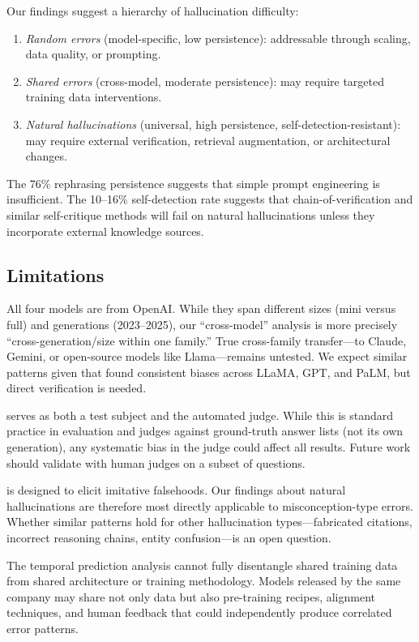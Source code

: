 Our findings suggest a hierarchy of hallucination difficulty:
\begin{enumerate}[leftmargin=*,itemsep=0pt,topsep=0pt]
    \item \emph{Random errors} (model-specific, low persistence): addressable through scaling, data quality, or prompting.
    \item \emph{Shared errors} (cross-model, moderate persistence): may require targeted training data interventions.
    \item \emph{Natural hallucinations} (universal, high persistence, self-detection-resistant): may require external verification, retrieval augmentation, or architectural changes.
\end{enumerate}
The 76\% rephrasing persistence suggests that simple prompt engineering is insufficient.
The 10--16\% self-detection rate suggests that chain-of-verification \citep{dhuliawala2023chain} and similar self-critique methods will fail on natural hallucinations unless they incorporate external knowledge sources.

\subsection{Limitations}
\label{sec:limitations}

All four models are from OpenAI.
While they span different sizes (mini versus full) and generations (2023--2025), our ``cross-model'' analysis is more precisely ``cross-generation/size within one family.''
True cross-family transfer---to Claude, Gemini, or open-source models like Llama---remains untested.
We expect similar patterns given that \citet{mckenna2023sources} found consistent biases across LLaMA, GPT, and PaLM, but direct verification is needed.

\gptfourone serves as both a test subject and the automated judge.
While this is standard practice in \truthfulqa evaluation and \gptfourone judges against ground-truth answer lists (not its own generation), any systematic bias in the judge could affect all results.
Future work should validate with human judges on a subset of questions.

\truthfulqa is designed to elicit imitative falsehoods.
Our findings about natural hallucinations are therefore most directly applicable to misconception-type errors.
Whether similar patterns hold for other hallucination types---fabricated citations, incorrect reasoning chains, entity confusion---is an open question.

The temporal prediction analysis cannot fully disentangle shared training data from shared architecture or training methodology.
Models released by the same company may share not only data but also pre-training recipes, alignment techniques, and human feedback that could independently produce correlated error patterns.

